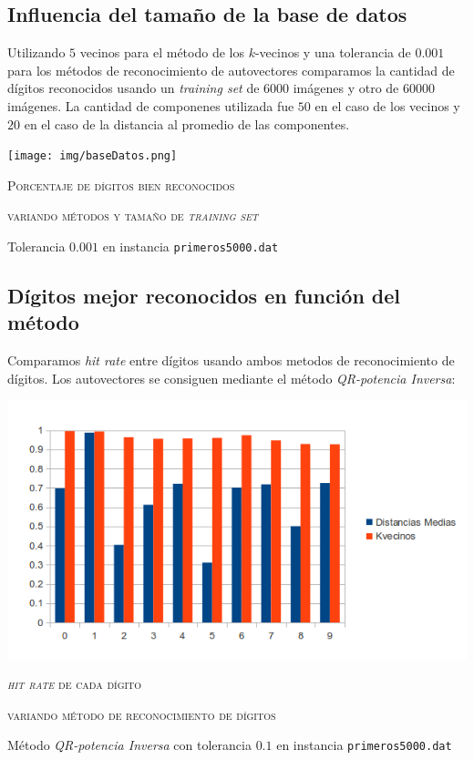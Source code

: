 	\subsection{Influencia del tama\~no de la base de datos}

		Utilizando $5$ vecinos para el m\'etodo de los $k$-vecinos y una tolerancia
		de $0.001$ para los m\'etodos de reconocimiento de autovectores comparamos
		la cantidad de d\'igitos reconocidos usando un \textit{training set} de
		$6000$ im\'agenes y otro de $60000$ im\'agenes.
		La cantidad de componenes utilizada fue $50$ en el caso de los vecinos
		y $20$ en el caso de la distancia al promedio de las componentes.

		\vspace{5mm}
		\centerline{\texttt{[image: img/baseDatos.png]}}
		\centerline{\textsc{Porcentaje de d\'igitos bien reconocidos}}
		\centerline{\textsc{variando m\'etodos y tama\~no de \textit{training set}}}
		\centerline{Tolerancia $0.001$ en instancia \texttt{primeros5000.dat}}
		\vspace{5mm}


	\subsection{D\'igitos mejor reconocidos en funci\'on del m\'etodo}

		Comparamos \textit{hit rate} entre d\'igitos usando ambos metodos de reconocimiento
		de d\'igitos. Los autovectores se consiguen mediante el m\'etodo
		\textit{QR-potencia Inversa}:

		\vspace{5mm}
		\centerline{\includegraphics[width=14cm]{img/bam.png}}
		\centerline{\textsc{\textit{hit rate} de cada d\'igito}}
		\centerline{\textsc{variando m\'etodo de reconocimiento de d\'igitos}}
		\centerline{M\'etodo \textit{QR-potencia Inversa} con tolerancia $0.1$ en
		instancia \texttt{primeros5000.dat}}
		\vspace{5mm}
